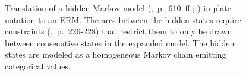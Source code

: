 \vspace*{1em}
\begin{figure}[h!]
\centering
\scalebox{\tikzScale}{\adjustTikzSize }
\caption[Hidden Markov model in plate notation to ERM translation]{Translation of a hidden Markov model (\cite{bishop2006pattern},~p.~610~ff.; \cite{baum1970maximization}) in plate notation to an ERM. The arcs between the hidden states require constraints (\cite{heckerman2007probabilistic},~p.~226-228) that restrict them to only be drawn between consecutive states in the expanded model. The hidden states are modeled as a homogeneous Markov chain emitting categorical values.}\label{fig:appendix_hmm}
\end{figure}

